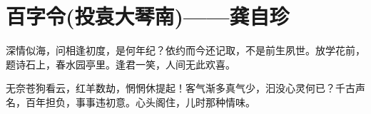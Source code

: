 \section{百字令(投袁大琴南)——龚自珍}


深情似海，问相逢初度，是何年纪？依约而今还记取，不是前生夙世。放学花前，题诗石上，春水园亭里。逢君一笑，人间无此欢喜。


无奈苍狗看云，红羊数劫，惘惘休提起！客气渐多真气少，汩没心灵何已？千古声名，百年担负，事事违初意。心头阁住，儿时那种情味。
